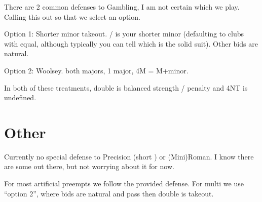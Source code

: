 \documentclass[tom-ari]{subfile}
\begin{document}
	There are 2 common defenses to Gambling, I am not certain which we play. Calling this out so that we select an option.
	
	Option 1:  Shorter minor takeout. / is your shorter minor (defaulting to clubs with equal, although typically you can tell which is the solid suit). Other bids are natural.
	
	Option 2:  Woolsey.  both majors,  1 major, 4M = M+minor.
	
	In both of these treatments, double is balanced strength / penalty and 4NT is undefined.
	
	\section{Other}
	
	Currently no special defense to  Precision (short \ddd) or (Mini)Roman. I know there are some out there, but not worrying about it for now.
	
	For most artificial preempts we follow the provided defense. For multi we use ``option 2'', where bids are natural and pass then double is takeout.
	
\end{document}
